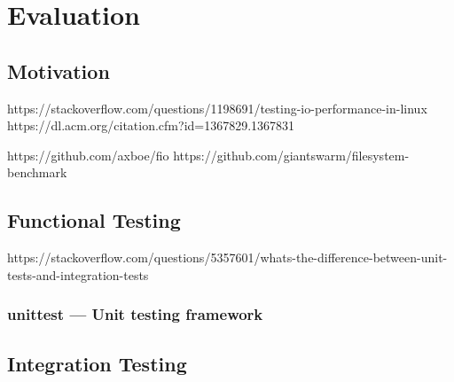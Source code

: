 \chapter{Evaluation}
\label{cha:evaluation}

\section{Motivation}
\label{sec:motivation}


https://stackoverflow.com/questions/1198691/testing-io-performance-in-linux
https://dl.acm.org/citation.cfm?id=1367829.1367831

https://github.com/axboe/fio
https://github.com/giantswarm/filesystem-benchmark

\section{Functional Testing}
\label{sec:rep_functional_testing}

https://stackoverflow.com/questions/5357601/whats-the-difference-between-unit-tests-and-integration-tests

\subsection{unittest — Unit testing framework}
\label{sub:unittest}


\section{Integration Testing}
\label{sub:integration_testing}